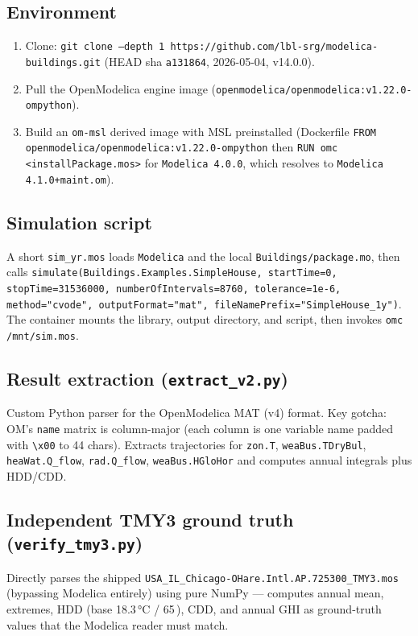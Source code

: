 \documentclass[11pt]{article}
\begin{document}
\subsection{Environment}
\begin{enumerate}
  \item Clone: \texttt{git clone --depth 1 https://github.com/lbl-srg/modelica-buildings.git}
        (HEAD sha \texttt{a131864}, 2026-05-04, v14.0.0).
  \item Pull the OpenModelica engine image
        (\texttt{openmodelica/openmodelica:v1.22.0-ompython}).
  \item Build an \texttt{om-msl} derived image with MSL preinstalled
        (Dockerfile \texttt{FROM openmodelica/openmodelica:v1.22.0-ompython}
        then \texttt{RUN omc <installPackage.mos>} for
        \texttt{Modelica 4.0.0}, which resolves to \texttt{Modelica 4.1.0+maint.om}).
\end{enumerate}

\subsection{Simulation script}
A short \texttt{sim\_yr.mos} loads \texttt{Modelica} and the local
\texttt{Buildings/package.mo}, then calls
\texttt{simulate(Buildings.Examples.SimpleHouse, startTime=0,
stopTime=31536000, numberOfIntervals=8760, tolerance=1e-6, method="cvode",
outputFormat="mat", fileNamePrefix="SimpleHouse\_1y")}.
The container mounts the library, output directory, and script,
then invokes \texttt{omc /mnt/sim.mos}.

\subsection{Result extraction (\texttt{extract\_v2.py})}
Custom Python parser for the OpenModelica MAT (v4) format. Key gotcha:
OM's \texttt{name} matrix is column-major (each column is one variable
name padded with \texttt{\textbackslash x00} to 44 chars). Extracts
trajectories for \texttt{zon.T}, \texttt{weaBus.TDryBul},
\texttt{heaWat.Q\_flow}, \texttt{rad.Q\_flow}, \texttt{weaBus.HGloHor}
and computes annual integrals plus HDD/CDD.

\subsection{Independent TMY3 ground truth (\texttt{verify\_tmy3.py})}
Directly parses the shipped
\texttt{USA\_IL\_Chicago-OHare.Intl.AP.725300\_TMY3.mos} (bypassing Modelica
entirely) using pure NumPy --- computes annual mean, extremes,
HDD (base 18.3\,\si{\celsius} / 65\,\si{\fahrenheit}), CDD, and annual GHI
as ground-truth values that the Modelica reader must match.
\end{document}

